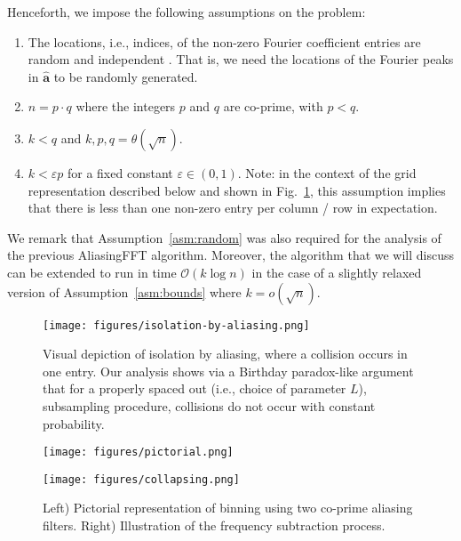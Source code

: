 \documentclass[11pt]{article}
\newcommand{\eps}{\varepsilon}
\theoremstyle{case}
\newcommand{\Bigo}{\mathcal{O}}
\newcommand{\aaa}{\mathbf{a}}
\begin{document}
Henceforth, we impose the following assumptions on the problem:
\begin{enumerate}
\item The locations, i.e., indices, of the non-zero Fourier coefficient entries are random and independent \label{asm:random}. That is, we need the locations of the Fourier peaks in $\hat{\aaa}$ to be randomly generated.
\item $n = p \cdot q$ where the integers $p$ and $q$ are co-prime, with $p < q$. \label{asm:co-prime}
\item $k < q$ and $k,p,q = \theta(\sqrt{n})$. \label{asm:bounds}
\item $k < \eps p$ for a fixed constant $\eps \in (0, 1)$. Note: in the context of the grid representation described below and shown in Fig.~\ref{fig:pictorial}, this assumption implies that there is less than one non-zero entry per column / row in expectation.
\end{enumerate}
We remark that Assumption~\ref{asm:random} was also required for the analysis of the previous AliasingFFT algorithm. Moreover, the algorithm that we will discuss can be extended to run in time $\Bigo(k \log n)$ in the case of a slightly relaxed version of Assumption~\ref{asm:bounds} where $k = o(\sqrt{n})$.

\begin{figure}
\texttt{[image: figures/isolation-by-aliasing.png]}
    \caption{Visual depiction of isolation by aliasing, where a collision occurs in one entry. Our analysis shows via a Birthday paradox-like argument that for a properly spaced out (i.e., choice of parameter $L$), subsampling procedure, collisions do not occur with constant probability.}
\end{figure}

\begin{figure}[ht]
\centering
  \begin{minipage}{0.33\textwidth}
  \centering
 \texttt{[image: figures/pictorial.png]}
   \end{minipage}%
   \hfill
   \begin{minipage}{0.65\textwidth}
  \centering
 \texttt{[image: figures/collapsing.png]} 
 \centering
   \end{minipage}%
    \caption{Left) Pictorial representation of binning using two co-prime aliasing filters. Right) Illustration of the frequency subtraction process.}
    \label{fig:pictorial}
\end{figure}
\end{document}
